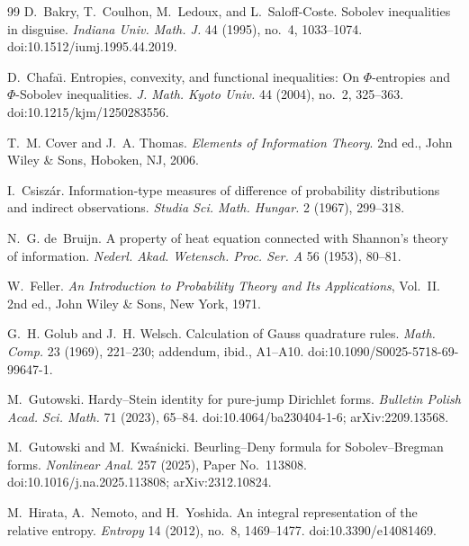 \begin{thebibliography}{99}
D.~Bakry, T.~Coulhon, M.~Ledoux, and L.~Saloff-Coste.
\newblock Sobolev inequalities in disguise.
\newblock \emph{Indiana Univ. Math. J.} 44 (1995), no.~4, 1033--1074.
\newblock doi:10.1512/iumj.1995.44.2019.

D.~Chafa{\"\i}.
\newblock Entropies, convexity, and functional inequalities: On
\(\Phi\)-entropies and \(\Phi\)-Sobolev inequalities.
\newblock \emph{J. Math. Kyoto Univ.} 44 (2004), no.~2, 325--363.
\newblock doi:10.1215/kjm/1250283556.

T.~M. Cover and J.~A. Thomas.
\newblock \emph{Elements of Information Theory}.
\newblock 2nd ed., John Wiley \& Sons, Hoboken, NJ, 2006.

I.~Csisz{\'a}r.
\newblock Information-type measures of difference of probability distributions
and indirect observations.
\newblock \emph{Studia Sci. Math. Hungar.} 2 (1967), 299--318.

N.~G. de~Bruijn.
\newblock A property of heat equation connected with Shannon's theory of
information.
\newblock \emph{Nederl. Akad. Wetensch. Proc. Ser. A} 56 (1953), 80--81.

W.~Feller.
\newblock \emph{An Introduction to Probability Theory and Its Applications},
Vol.~II.
\newblock 2nd ed., John Wiley \& Sons, New York, 1971.

G.~H. Golub and J.~H. Welsch.
\newblock Calculation of {G}auss quadrature rules.
\newblock \emph{Math. Comp.} 23 (1969), 221--230; addendum, ibid., A1--A10.
\newblock doi:10.1090/S0025-5718-69-99647-1.

M.~Gutowski.
\newblock Hardy--Stein identity for pure-jump Dirichlet forms.
\newblock \emph{Bulletin Polish Acad. Sci. Math.} 71 (2023), 65--84.
\newblock doi:10.4064/ba230404-1-6; arXiv:2209.13568.

M.~Gutowski and M.~Kwa{\'s}nicki.
\newblock Beurling--Deny formula for Sobolev--Bregman forms.
\newblock \emph{Nonlinear Anal.} 257 (2025), Paper No.~113808.
\newblock doi:10.1016/j.na.2025.113808; arXiv:2312.10824.

M.~Hirata, A.~Nemoto, and H.~Yoshida.
\newblock An integral representation of the relative entropy.
\newblock \emph{Entropy} 14 (2012), no.~8, 1469--1477.
\newblock doi:10.3390/e14081469.


\end{thebibliography}
